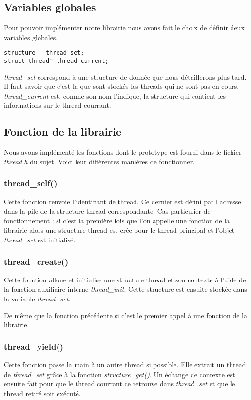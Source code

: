 \subsection{Variables globales}
Pour pouvoir implémenter notre librairie nous avons fait le choix de
définir deux variables globales.
\begin{verbatim}
structure   thread_set;
struct thread* thread_current;
\end{verbatim}
\textit{thread\_set} correspond à une structure de donnée que nous
détaillerons plus tard. Il faut savoir que c'est la que sont stockés
les threads qui ne sont pas en cours.  \textit{thread\_current} est,
comme son nom l'indique, la structure qui contient les informations
sur le thread courrant.

\subsection{Fonction de la librairie}
Nous avons implémenté les fonctions dont le prototype est fourni dans
le fichier \textit{thread.h} du sujet. Voici leur différentes manières
de fonctionner.

\subsubsection{thread\_self()}
Cette fonction renvoie l'identifiant de thread. Ce dernier est défini
par l'adresse dans la pile de la structure thread correspondante.
Cas particulier de fonctionnement : si c'est la première fois que l'on
appelle une fonction de la librairie alors une structure thread est
crée pour le thread principal et l'objet \textit{thread\_set} est
initialisé.

\subsubsection{thread\_create()}
Cette fonction alloue et initialise une structure thread et son
contexte à l'aide de la fonction auxiliaire interne
\textit{thread\_init}.  Cette structure est ensuite stockée dans la
variable \textit{thread\_set}.

De même que la fonction précédente si c'est le
premier appel à une fonction de la librairie.



\subsubsection{thread\_yield()}
Cette fonction passe la main à un autre thread si possible. Elle
extrait un thread de \textit{thread\_set} grâce à la fonction
\textit{structure\_get()}. Un échange de contexte est
ensuite fait pour que le thread courrant ce retrouve dans
\textit{thread\_set} et que le thread retiré soit exécuté.

